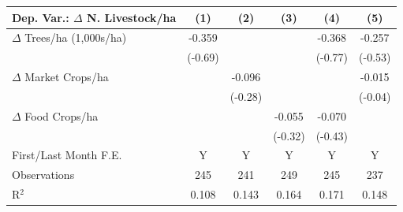 {
\def\sym#1{\ifmmode^{#1}\else\(^{#1}\)\fi}
\begin{tabular*}{\hsize}{@{\hskip\tabcolsep\extracolsep\fill}l*{5}{c}}
\toprule
Dep. Var.: $\Delta$ N. Livestock/ha&      (1)         &      (2)         &      (3)         &      (4)         &      (5)         \\
\midrule
$\Delta$ Trees/ha (1,000s/ha)&   -0.359         &                  &                  &   -0.368         &   -0.257         \\
                &  (-0.69)         &                  &                  &  (-0.77)         &  (-0.53)         \\
$\Delta$ Market Crops/ha&                  &   -0.096         &                  &                  &   -0.015         \\
                &                  &  (-0.28)         &                  &                  &  (-0.04)         \\
$\Delta$ Food Crops/ha&                  &                  &   -0.055         &   -0.070         &                  \\
                &                  &                  &  (-0.32)         &  (-0.43)         &                  \\
\midrule
First/Last Month F.E.&        Y         &        Y         &        Y         &        Y         &        Y         \\
Observations    &      245         &      241         &      249         &      245         &      237         \\
R$^2$           &    0.108         &    0.143         &    0.164         &    0.171         &    0.148         \\
\bottomrule
\end{tabular*}
}

